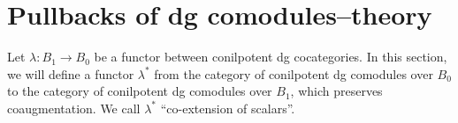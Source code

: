 \section{Pullbacks of dg comodules--theory}
Let $\lambda: B_1 \to B_0$ be a 
functor between conilpotent 
dg cocategories. 
In this section, we will define 
a functor $\lambda^*$ from the 
category of conilpotent dg 
comodules over 
$B_0$ to the category of 
conilpotent dg 
comodules over $B_1$, which 
preserves coaugmentation. We 
call $\lambda^*$
``co-extension of scalars''.
%

